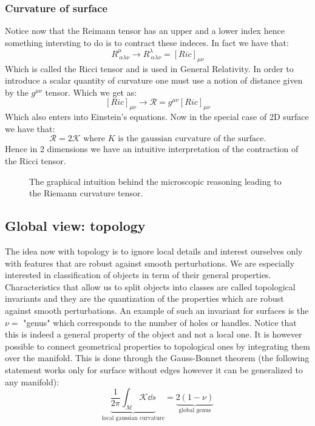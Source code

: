 \documentclass[10pt,a4paper]{book}
\begin{document}
\subsubsection{Curvature of surface}
Notice now that the Reimann tensor has an upper and a lower index hence something intersting to do is to contract these indeces. In fact we have that:
\[
R_{~\alpha \lambda \nu}^\mu \to R_{~\alpha \lambda \nu}^\lambda = [Ric]_{\mu \nu}
\]
Which is called the Ricci tensor and is used in General Relativity. In order to introduce a scalar quantity of curvature one must use a notion of distance given by the $g^{\mu \nu}$ tensor. Which we get as:
\[
[Ric]_{\mu \nu} \to \mathcal{R} = g^{\mu \nu} [Ric]_{\mu \nu}
\] 
Which also enters into Einstein's equations. Now in the special case of 2D surface we have that:
\[
\mathcal{R} = 2 \mathcal{K} \text{ where } K \text{ is the gaussian curvature of the surface.}
\]
Hence in 2 dimensions we have an intuitive interpretation of the contraction of the Ricci tensor. 


\begin{figure} [h]
\label{reimann-curvature}
\centering
{}
\caption{The graphical intuition behind the microscopic reasoning leading to the Riemann curvature tensor.}
\end{figure}

\subsection{Global view: topology}
The idea now with topology is to ignore local details and interest ourselves only with features that are robust against smooth perturbations. We are especially interested in classification of objects in term of their general properties. Characteristics that allow us to split objects into classes are called topological invariants and they are the quantization of the properties which are robust against smooth perturbations. An example of such an invariant for surfaces is the $\nu = $ "genus" which corresponds to the number of holes or handles. Notice that this is indeed a general property of the object and not a local one. It is however possible to connect geometrical properties to topological ones by integrating them over the manifold. This is done through the Gauss-Bonnet theorem (the following statement works only for surface without edges however it can be generalized to any manifold):
\[ 
\underbrace{\frac{1}{2\pi} \int_\mathcal{M} \mathcal{K} \dd s}_{\text{local gaussian curvature}} = \underbrace{2 (1 - \nu)}_{\text{global genus}}
\]
\end{document}
